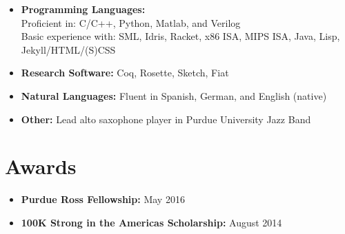 \documentclass[10pt,a4paper,sans]{moderncv}        %
\begin{document}
\begin{itemize}

\item \textbf{Programming Languages:} \\
  Proficient in: C/C++, Python, Matlab, and Verilog \\ Basic experience with: SML, Idris, Racket,
  x86 ISA, MIPS ISA, Java, Lisp, Jekyll/HTML/(S)CSS

\vspace{4pt}

\item \textbf{Research Software:} Coq, Rosette, Sketch, Fiat

\vspace{4pt}

\item \textbf{Natural Languages:} Fluent in Spanish, German, and English (native)

\vspace{4pt}

\item \textbf{Other:} Lead alto saxophone player in Purdue University
  Jazz Band

\end{itemize}

\section{Awards}

\vspace{4pt}

\begin{itemize}


\item \textbf{Purdue Ross Fellowship:} May 2016
\vspace{4pt}
\item \textbf{100K Strong in the Americas Scholarship:} August 2014

\end{itemize}


\nocite{*}



\end{document}
